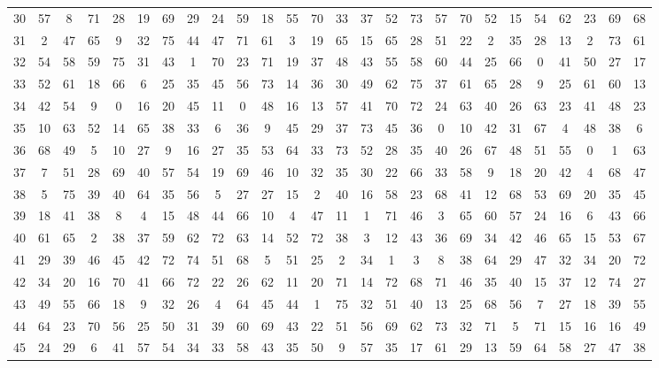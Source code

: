 \begin{table}
\begin{tabular}{c c c c c c c c c c c c c c c c c c c c c c c c c c }
30 & 57 & 8 & 71 & 28 & 19 & 69 & 29 & 24 & 59 & 18 & 55 & 70 & 33 & 37 & 52 & 73 & 57 & 70 & 52 & 15 & 54 & 62 & 23 & 69 & 68 \\
31 & 2 & 47 & 65 & 9 & 32 & 75 & 44 & 47 & 71 & 61 & 3 & 19 & 65 & 15 & 65 & 28 & 51 & 22 & 2 & 35 & 28 & 13 & 2 & 73 & 61 \\
32 & 54 & 58 & 59 & 75 & 31 & 43 & 1 & 70 & 23 & 71 & 19 & 37 & 48 & 43 & 55 & 58 & 60 & 44 & 25 & 66 & 0 & 41 & 50 & 27 & 17 \\
33 & 52 & 61 & 18 & 66 & 6 & 25 & 35 & 45 & 56 & 73 & 14 & 36 & 30 & 49 & 62 & 75 & 37 & 61 & 65 & 28 & 9 & 25 & 61 & 60 & 13 \\
34 & 42 & 54 & 9 & 0 & 16 & 20 & 45 & 11 & 0 & 48 & 16 & 13 & 57 & 41 & 70 & 72 & 24 & 63 & 40 & 26 & 63 & 23 & 41 & 48 & 23 \\
35 & 10 & 63 & 52 & 14 & 65 & 38 & 33 & 6 & 36 & 9 & 45 & 29 & 37 & 73 & 45 & 36 & 0 & 10 & 42 & 31 & 67 & 4 & 48 & 38 & 6 \\
36 & 68 & 49 & 5 & 10 & 27 & 9 & 16 & 27 & 35 & 53 & 64 & 33 & 73 & 52 & 28 & 35 & 40 & 26 & 67 & 48 & 51 & 55 & 0 & 1 & 63 \\
37 & 7 & 51 & 28 & 69 & 40 & 57 & 54 & 19 & 69 & 46 & 10 & 32 & 35 & 30 & 22 & 66 & 33 & 58 & 9 & 18 & 20 & 42 & 4 & 68 & 47 \\
38 & 5 & 75 & 39 & 40 & 64 & 35 & 56 & 5 & 27 & 27 & 15 & 2 & 40 & 16 & 58 & 23 & 68 & 41 & 12 & 68 & 53 & 69 & 20 & 35 & 45 \\
39 & 18 & 41 & 38 & 8 & 4 & 15 & 48 & 44 & 66 & 10 & 4 & 47 & 11 & 1 & 71 & 46 & 3 & 65 & 60 & 57 & 24 & 16 & 6 & 43 & 66 \\
40 & 61 & 65 & 2 & 38 & 37 & 59 & 62 & 72 & 63 & 14 & 52 & 72 & 38 & 3 & 12 & 43 & 36 & 69 & 34 & 42 & 46 & 65 & 15 & 53 & 67 \\
41 & 29 & 39 & 46 & 45 & 42 & 72 & 74 & 51 & 68 & 5 & 51 & 25 & 2 & 34 & 1 & 3 & 8 & 38 & 64 & 29 & 47 & 32 & 34 & 20 & 72 \\
42 & 34 & 20 & 16 & 70 & 41 & 66 & 72 & 22 & 26 & 62 & 11 & 20 & 71 & 14 & 72 & 68 & 71 & 46 & 35 & 40 & 15 & 37 & 12 & 74 & 27 \\
43 & 49 & 55 & 66 & 18 & 9 & 32 & 26 & 4 & 64 & 45 & 44 & 1 & 75 & 32 & 51 & 40 & 13 & 25 & 68 & 56 & 7 & 27 & 18 & 39 & 55 \\
44 & 64 & 23 & 70 & 56 & 25 & 50 & 31 & 39 & 60 & 69 & 43 & 22 & 51 & 56 & 69 & 62 & 73 & 32 & 71 & 5 & 71 & 15 & 16 & 16 & 49 \\
45 & 24 & 29 & 6 & 41 & 57 & 54 & 34 & 33 & 58 & 43 & 35 & 50 & 9 & 57 & 35 & 17 & 61 & 29 & 13 & 59 & 64 & 58 & 27 & 47 & 38 \\

\end{tabular}
\end{table}
